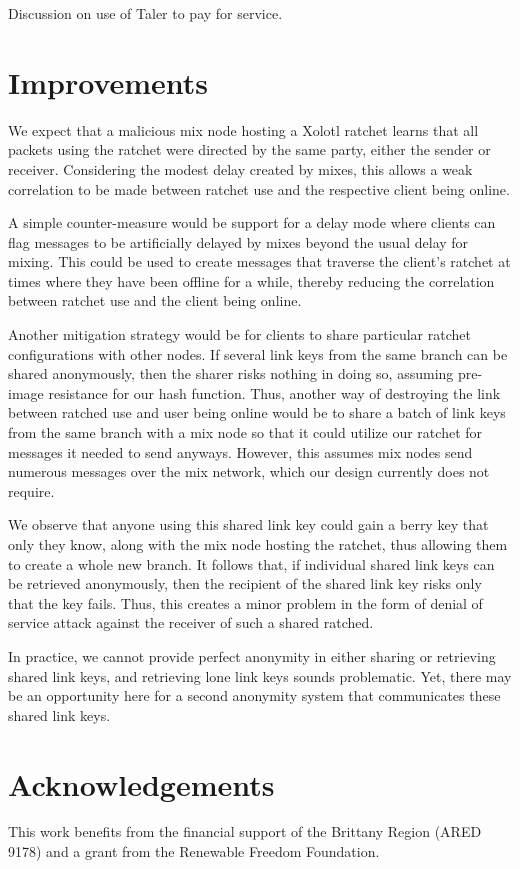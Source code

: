 \documentclass[twoside,letterpaper]{llncs}
\begin{document}
Discussion on use of Taler to pay for service.



\section{Improvements}

We expect that a malicious mix node hosting a Xolotl ratchet learns
that all packets using the ratchet were directed by the same party,
either the sender or receiver.  Considering the modest delay created
by mixes, this allows a weak correlation to be made between ratchet
use and the respective client being online.

A simple counter-measure would be support for a delay mode where
clients can flag messages to be artificially delayed by mixes beyond
the usual delay for mixing.  This could be used to create messages
that traverse the client's ratchet at times where they have been
offline for a while, thereby reducing the correlation between ratchet
use and the client being online.

Another mitigation strategy would be for clients
to share particular ratchet configurations with other nodes.
If several link keys from the same branch can be shared anonymously,
then the sharer risks nothing in doing so, assuming pre-image
resistance for our hash function.  Thus, another way of destroying the
link between ratched use and user being online would be to share a
batch of link keys from the same branch with a mix node so that it
could utilize our ratchet for messages it needed to send anyways.
However, this assumes mix nodes send numerous messages over the mix
network, which our design currently does not require.

We observe that anyone using this shared link key could gain a berry
key that only they know, along with the mix node hosting the ratchet,
thus allowing them to create a whole new branch.  It follows that,
if individual shared link keys can be retrieved anonymously, then
the recipient of the shared link key risks only that the key fails.
Thus, this creates a minor problem in the form of denial of service
attack against the receiver of such a shared ratched.

In practice, we cannot provide perfect anonymity in either sharing or
retrieving shared link keys, and retrieving lone link keys sounds
problematic.  Yet, there may be an opportunity here for a second
anonymity system that communicates these shared link keys.


\section*{Acknowledgements}

This work benefits from the financial support of the Brittany Region
(ARED 9178) and a grant from the Renewable Freedom Foundation.




\end{document}
